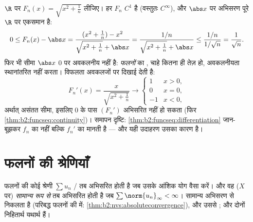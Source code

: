 \begin{example}[परिकल्पना अवकलजों पर क्यों बैठती है]\label{ex:b2:funcseq:sqrtabs}
$\R$ पर $F_n(x) = \sqrt{x^2 + \frac1n}$ लीजिए। हर $F_n$ $C^1$ है (वस्तुतः $C^\infty$), और $\abs x$ पर अभिसरण पूरे $\R$
पर एकसमान है:
\[
0 \leq F_n(x) - \abs x
= \frac{(x^2 + \frac1n) - x^2}{\sqrt{x^2+\frac1n} + \abs x}
= \frac{1/n}{\sqrt{x^2 + \frac1n} + \abs x}
\leq \frac{1/n}{1/\sqrt n} = \frac{1}{\sqrt n} .
\]
फिर भी सीमा $\abs x$ $0$ पर अवकलनीय नहीं है: \emph{फलनों} का ,
चाहे कितना ही तेज़ हो, अवकलनीयता स्थानांतरित नहीं करता। विफलता अवकलजों पर
दिखाई देती है:
\[
F_n'(x) = \frac{x}{\sqrt{x^2 + \frac1n}}
\longrightarrow \begin{cases} 1 & x > 0,\\ 0 & x = 0,\\
-1 & x < 0, \end{cases}
\]
अर्थात् असंतत  सीमा, इसलिए $0$ के पास $(F_n')$ 
अभिसरित नहीं हो सकता (फिर \cref{thm:b2:funcseq:continuity})। समापन दृष्टि: \cref{thm:b2:funcseq:differentiation} जान-बूझकर $f_n$ का
नहीं बल्कि $f_n'$ का  मानती है --- और यही उदाहरण उसका कारण
है।
\end{example}

\section{फलनों की श्रेणियाँ}

\begin{definition}\label{def:b2:funcseq:series}
फलनों की कोई श्रेणी $\sum u_n$ / तब अभिसरित होती है जब
उसके आंशिक योग वैसा करें। और वह ($X$ पर) \emph{सामान्य रूप
से} तब अभिसरित होती है जब $\sum
\norm{u_n}_\infty < \infty$। सामान्य अभिसरण से
 निकलता है (परिबद्ध फलनों की  में: \cref{thm:b2:nvs:absoluteconvergence}), और उससे
; और दोनों निहितार्थ यथार्थ हैं।
\end{definition}

